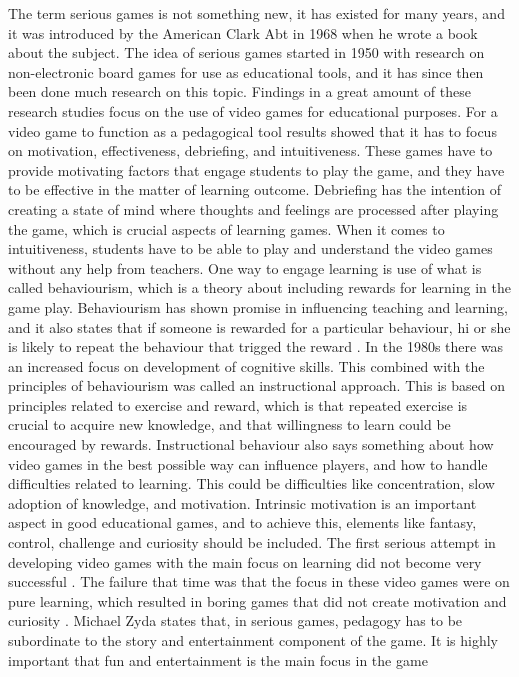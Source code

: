 The term serious games is not something new, it has existed for many years, and it was introduced by the American Clark Abt in 1968 when he wrote a book about the subject. The idea of serious games started in 1950 with research on non-electronic board games for use as educational tools, and it has since then been done much research on this topic. Findings in a great amount of these research studies focus on the use of video games for educational purposes. For a video game to function as a pedagogical tool results showed that it has to focus on motivation, effectiveness, debriefing, and intuitiveness. These games have to provide motivating factors that engage students to play the game, and they have to be effective in the matter of learning outcome. Debriefing has the intention of creating a state of mind where thoughts and feelings are processed after playing the game, which is crucial aspects of learning games. When it comes to intuitiveness, students have to be able to play and understand the video games without any help from teachers. One way to engage learning is use of what is called behaviourism, which is a theory about including rewards for learning in the game play. Behaviourism has shown promise in influencing teaching and learning, and it also states that if someone is rewarded for a particular behaviour, hi or she is likely to repeat the behaviour that trigged the reward \cite{behaviour}. In the 1980s there was an increased focus on development of cognitive skills. This combined with the principles of behaviourism was called an instructional approach. This is based on principles related to exercise and reward, which is that repeated exercise is crucial to acquire new knowledge, and that willingness to learn could be encouraged by rewards. Instructional behaviour also says something about how video games in the best possible way can influence players, and how to handle difficulties related to learning. This could be difficulties like concentration, slow adoption of knowledge, and motivation. Intrinsic motivation is an important aspect in good educational games, and to achieve this, elements like fantasy, control, challenge and curiosity should be included.         The first serious attempt in developing video games with the main focus on learning did not become very successful \cite{understandingvg}. The failure that time was that the focus in these  video games were on pure learning, which resulted in boring games that did not create motivation and curiosity \cite{understandingvg} \cite{susi2007serious}. Michael Zyda states that, in serious games, pedagogy has to be subordinate to the story and entertainment component of the game. It is highly important that fun and entertainment is the main focus in the game \cite{zyda2005visual}

